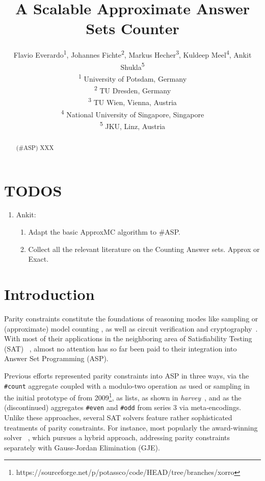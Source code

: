 \documentclass[letterpaper]{article} %
\title{A Scalable Approximate Answer Sets Counter}
\author{Flavio Everardo\textsuperscript{\rm 1}, Johannes Fichte\textsuperscript{\rm 2}, Markus Hecher\textsuperscript{\rm 3}, Kuldeep Meel\textsuperscript{\rm 4}, Ankit Shukla\textsuperscript{\rm 5} \\ %
\textsuperscript{\rm 1} University of Potsdam, Germany\\ 
\textsuperscript{\rm 2} TU Dresden, Germany\\ 
\textsuperscript{\rm 3}  TU Wien, Vienna, Austria \\ \textsuperscript{\rm 4} National University of Singapore, Singapore \\ \textsuperscript{\rm 5} JKU, Linz, Austria
}
\def\approxmc{\textsf{ApproxMC}\xspace}
\def\asp{\textsf{\#ASP}\xspace}
\begin{document}
\maketitle

\begin{abstract}
(\asp) XXX
\end{abstract}

\section{TODOS} \label{sec:todos}
\begin{enumerate}
	\item Ankit: 
	    \begin{enumerate}
	    	\item Adapt the basic \approxmc algorithm to \asp.
	    	\item Collect all the relevant literature on the Counting Answer sets. Approx or Exact. 
	    \end{enumerate}
\end{enumerate}

\section{Introduction} \label{sec:introduction}
 Parity constraints constitute the
 foundations
 of reasoning modes like sampling or (approximate) model counting \cite{meel18a},
 as well as circuit verification and cryptography~\cite{laitinen14a}.
 With most of their applications
 in the neighboring area of Satisfiability Testing (SAT)%
 ~\cite{meel18a},
 almost no attention has so far been paid to their integration into Answer Set Programming (ASP).%
 
 Previous efforts represented parity constraints into ASP in three ways,
 via the \texttt{\#count} aggregate coupled with a modulo-two operation as used or sampling in the initial prototype of \xorro{} from 2009\footnote{https://sourceforge.net/p/potassco/code/HEAD/tree/branches/xorro},
 as lists, as shown in \emph{harvey}~\cite{groeto17a},
 and as the (discontinued) aggregates \texttt{\#even} and \texttt{\#odd} from \gringo{} series 3 via meta-encodings.
 Unlike these approaches, several SAT solvers feature rather sophisticated treatments of parity constraints.
 For instance, most popularly the award-winning solver \cryptominisat~\cite{sonoca09a}, which pursues a hybrid approach,
 addressing parity constraints separately with Gauss-Jordan Elimination (GJE).
 
\end{document}
